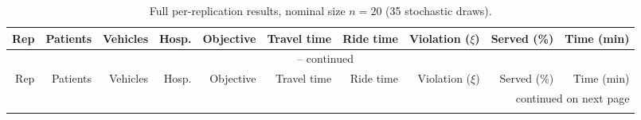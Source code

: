 \begingroup
\footnotesize
\setlength{\tabcolsep}{3pt}
\renewcommand{\arraystretch}{0.90}

\begin{longtable}{rrrrrrrrrr}
\caption{Full per-replication results, nominal size $n=20$ (35 stochastic draws).}
\label{tab:full-20} \\
\toprule
Rep & Patients & Vehicles & Hosp. & Objective & Travel time & Ride time & Violation ($\xi$) & Served (\%) & Time (min) \\
\midrule
\endfirsthead

\multicolumn{10}{c}{\tablename\ \thetable{} -- continued} \\
\toprule
Rep & Patients & Vehicles & Hosp. & Objective & Travel time & Ride time & Violation ($\xi$) & Served (\%) & Time (min) \\
\midrule
\endhead

\midrule
\multicolumn{10}{r}{continued on next page} \\
\endfoot

\bottomrule
\endlastfoot


\end{longtable}
